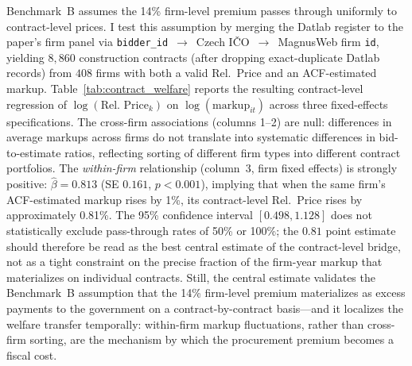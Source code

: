 \documentclass[11pt]{article}
\begin{document}
Benchmark~B assumes the 14\% firm-level premium passes through uniformly to contract-level prices. I test this assumption by merging the Datlab register to the paper's firm panel via \texttt{bidder\_id}~$\to$~Czech IČO~$\to$~MagnusWeb firm \texttt{id}, yielding $8{,}860$ construction contracts (after dropping exact-duplicate Datlab records) from $408$ firms with both a valid Rel.\ Price and an ACF-estimated markup. Table~\ref{tab:contract_welfare} reports the resulting contract-level regression of $\log(\text{Rel.\ Price}_k)$ on $\log(\text{markup}_{it})$ across three fixed-effects specifications. The cross-firm associations (columns 1--2) are null: differences in average markups across firms do not translate into systematic differences in bid-to-estimate ratios, reflecting sorting of different firm types into different contract portfolios. The \emph{within-firm} relationship (column~3, firm fixed effects) is strongly positive: $\hat\beta = 0.813$ (SE $0.161$, $p < 0.001$), implying that when the same firm's ACF-estimated markup rises by 1\%, its contract-level Rel.\ Price rises by approximately 0.81\%. The 95\% confidence interval $[0.498, 1.128]$ does not statistically exclude pass-through rates of 50\% or 100\%; the $0.81$ point estimate should therefore be read as the best central estimate of the contract-level bridge, not as a tight constraint on the precise fraction of the firm-year markup that materializes on individual contracts. Still, the central estimate validates the Benchmark~B assumption that the 14\% firm-level premium materializes as excess payments to the government on a contract-by-contract basis---and it localizes the welfare transfer temporally: within-firm markup fluctuations, rather than cross-firm sorting, are the mechanism by which the procurement premium becomes a fiscal cost.


\end{document}
